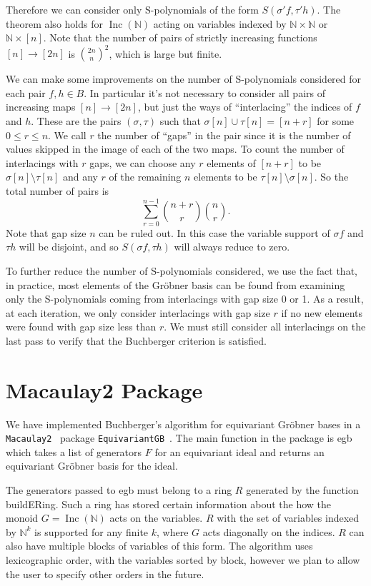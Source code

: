 \documentclass[10pt]{amsart}
\theoremstyle{definition}
\theoremstyle{remark}
\numberwithin{equation}{section}
\newcommand{\B}[1]{\mathbb #1}
\newcommand{\<}{\langle}
\renewcommand{\>}{\rangle}
\newcommand{\Inc}{\operatorname{Inc}(\B N)}
\begin{document}
Therefore we can consider only S-polynomials of the form $S(\sigma' f,\tau' h)$.  The theorem also holds for $\Inc$ acting on variables indexed by $\B N \times \B N$ or $\B N \times [n]$.  Note that the number of pairs of strictly increasing functions $[n] \to [2n]$ is $\binom{2n}{n}^2$, which is large but finite.

We can make some improvements on the number of S-polynomials considered for each pair $f,h \in B$.  In particular it's not necessary to consider all pairs of increasing maps $[n] \to [2n]$, but just the ways of ``interlacing'' the indices of $f$ and $h$.  These are the pairs $(\sigma,\tau)$ such that $\sigma[n] \cup \tau[n] = [n+r]$ for some $0 \leq r \leq n$.  We call $r$ the number of ``gaps'' in the pair since it is the number of values skipped in the image of each of the two maps.  To count the number of interlacings with $r$ gaps, we can choose any $r$ elements of $[n+r]$ to be $\sigma[n] \setminus \tau[n]$ and any $r$ of the remaining $n$ elements to be $\tau[n] \setminus \sigma[n]$.  So the total number of pairs is
 \[ \sum_{r=0}^{n-1} \binom{n+r}{r}\binom{n}{r}. \]
Note that gap size $n$ can be ruled out.  In this case the variable support of $\sigma f$ and $\tau h$ will be disjoint, and so $S(\sigma f, \tau h)$ will always reduce to zero.

To further reduce the number of S-polynomials considered, we use the fact that, in practice, most elements of the Gr\"obner basis can be found from examining only the S-polynomials coming from interlacings with gap size 0 or 1.  As a result, at each iteration, we only consider interlacings with gap size $r$ if no new elements were found with gap size less than $r$.  We must still consider all interlacings on the last pass to verify that the Buchberger criterion is satisfied.

\section{Macaulay2 Package}
We have implemented Buchberger's algorithm for equivariant Gr\"obner bases in a {\tt Macaulay2}~\cite{M2www} package {\tt EquivariantGB}~\cite{EquivariantGB}. The main function in the package is {\ttfamily egb} which takes a list of generators $F$ for an equivariant ideal and returns an equivariant Gr\"obner basis for the ideal.

The generators passed to {\ttfamily egb} must belong to a ring $R$ generated by the function {\ttfamily buildERing}.  Such a ring has stored certain information about the how the monoid $G = \Inc$ acts on the variables.  $R$ with the set of variables indexed by $\B N^k$ is supported for any finite $k$, where $G$ acts diagonally on the indices.   $R$ can also have multiple blocks of variables of this form.  The algorithm uses lexicographic order, with the variables sorted by block, however we plan to allow the user to specify other orders in the future.
\end{document}
